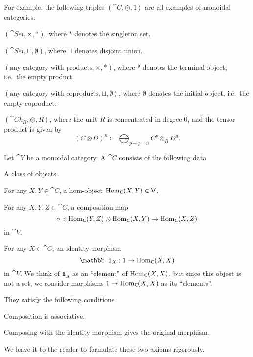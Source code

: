 For example, the following triples $(\cat C,\otimes,1)$
are all examples of monoidal categories:
\begin{itms}
    \item $(\cat{Set},\times,*)$, where $*$ denotes the singleton set.
    \item $(\cat{Set},\sqcup,\emptyset)$, where $\sqcup$ denotes disjoint union.
    \item $(\text{any category with products},\times,*)$, where $*$ denotes the terminal object, i.e.\ the empty product.
    \item $(\text{any category with coproducts},\sqcup,\emptyset)$, where $\emptyset$ denotes the initial object, i.e.\ the empty coproduct.
    \item $(\cat{Ch}_R,\otimes,R)$,
    where the unit $R$ is concentrated in degree $0$, and the tensor product is given by
    \[ (C\otimes D)^n\coloneq\bigoplus_{p+q=n}C^p\otimes_R D^q. \]
\end{itms}

\begin{definition}
    Let $\cat V$ be a monoidal category.
    A  $\cat C$
    consists of the following data.
    \begin{itms}
        \item A class of objects.
        \item For any $X,Y\in\cat C$, a hom-object $\operatorname{Hom}_{\textup{\textsf{C}}}(X,Y)\in\textup{\textsf{V}}$.
        \item For any $X,Y,Z\in\cat C$, a composition map
        \[\circ\ \colon\operatorname{Hom}_{\textup{\textsf{C}}}(Y,Z)\otimes\operatorname{Hom}_{\textup{\textsf{C}}}(X,Y)\to\operatorname{Hom}_{\textup{\textsf{C}}}(X,Z)\]
        in $\cat V$.
        \item For any $X\in\cat C$, an identity morphism \[\mathbb1_X:1\to\Hom_{\cat C}(X,X)\]
        in $\cat V$.
        We think of $\mathbb1_X$ as an ``element'' of $\operatorname{Hom}_{\textup{\textsf{C}}}(X,X)$,
        but since this object is not a set,
        we consider morphisms $1\to\operatorname{Hom}_{\textup{\textsf{C}}}(X,X)$
        as its ``elements''.
    \end{itms}
    They satisfy the following conditions.
    \begin{itms}
        \item Composition is associative.
        \item Composing with the identity morphism gives the original morphism.
    \end{itms}
    We leave it to the reader to formulate these two axioms rigorously.
\end{definition}

